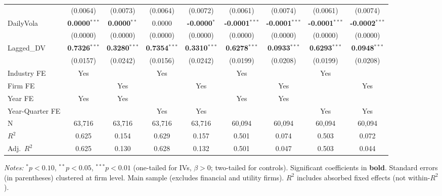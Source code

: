 \begin{landscape}
\begin{table}[H]
\begin{tabular}{lcccccccc}
 & (0.0064) & (0.0073) & (0.0064) & (0.0072) & (0.0061) & (0.0074) & (0.0061) & (0.0074) \\
DailyVola & \textbf{0.0000}$^{***}$ & \textbf{0.0000}$^{**}$ & 0.0000 & \textbf{-0.0000}$^{*}$ & \textbf{-0.0001}$^{***}$ & \textbf{-0.0001}$^{***}$ & \textbf{-0.0001}$^{***}$ & \textbf{-0.0002}$^{***}$ \\
 & (0.0000) & (0.0000) & (0.0000) & (0.0000) & (0.0000) & (0.0000) & (0.0000) & (0.0000) \\
Lagged\_DV & \textbf{0.7326}$^{***}$ & \textbf{0.3280}$^{***}$ & \textbf{0.7354}$^{***}$ & \textbf{0.3310}$^{***}$ & \textbf{0.6278}$^{***}$ & \textbf{0.0933}$^{***}$ & \textbf{0.6293}$^{***}$ & \textbf{0.0948}$^{***}$ \\
 & (0.0157) & (0.0242) & (0.0156) & (0.0242) & (0.0199) & (0.0208) & (0.0199) & (0.0208) \\
\midrule
Industry FE & Yes &  & Yes &  & Yes &  & Yes &  \\
Firm FE &  & Yes &  & Yes &  & Yes &  & Yes \\
Year FE & Yes & Yes &  &  & Yes & Yes &  &  \\
Year-Quarter FE &  &  & Yes & Yes &  &  & Yes & Yes \\
\midrule
N & 63,716 & 63,716 & 63,716 & 63,716 & 60,094 & 60,094 & 60,094 & 60,094 \\
$R^2$ & 0.625 & 0.154 & 0.629 & 0.157 & 0.501 & 0.074 & 0.503 & 0.072 \\
Adj.~$R^2$ & 0.625 & 0.130 & 0.628 & 0.132 & 0.501 & 0.047 & 0.503 & 0.044 \\
\bottomrule
\end{tabular}
\begin{minipage}{\linewidth}
\vspace{2pt}\scriptsize
\textit{Notes:} $^{*}p<0.10$, $^{**}p<0.05$, $^{***}p<0.01$ (one-tailed for IVs, $\beta > 0$; two-tailed for controls).
 Significant coefficients in \textbf{bold}.
 Standard errors (in parentheses) clustered at firm level.
 Main sample (excludes financial and utility firms).
 $R^2$ includes absorbed fixed effects (not within-$R^2$).
\end{minipage}
\end{table}
\end{landscape}